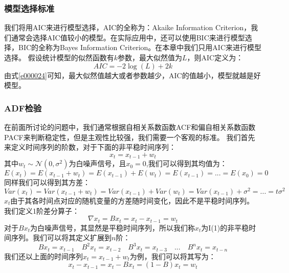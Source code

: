 \documentclass{article}
\begin{document}
\subsubsection{模型选择标准}
我们将用AIC来进行模型选择，AIC的全称为：Akaike Information Criterion，我们通常会选择AIC值较小的模型。在实际应用中，还可以使用BIC来进行模型选择，BIC的全称为Bayes Information Criterion。在本章中我们只用AIC来进行模型选择。\newline
假设统计模型的似然函数有$k$参数，最大似然值为$L$，则AIC定义为：
\begin{equation}
AIC=-2\log(L) + 2k
\label{e000024}
\end{equation}
由式\ref{e000024}可知，最大似然值越大或者参数越少，AIC的值越小，模型就越是好模型。
\subsubsection{ADF检验}
在前面所讨论的问题中，我们通常根据自相关系数函数ACF和偏自相关系数函数PACF来判断稳定性，但是主观性比较强，我们需要一个客观的标准。\newline
我们首先来定义时间序列的阶数，对于下面的非平稳时间序列：
\begin{equation}
x_{t}=x_{t-1}+w_{t}
\label{e000036}
\end{equation}
其中$w_{t} \sim \mathcal{N}(0, \sigma ^{2})$为白噪声信号，且$x_{0}=0$,我们可以得到其均值为：
\begin{equation}
E(x_{t})=E(x_{t-1}+w_{t})=E(x_{t-1})+E(w_{t})=E(x_{t-1})=...=E(x_{0})=0
\label{e000037}
\end{equation}
同样我们可以得到其方差：
\begin{equation}
Var(x_{t})=Var(x_{t-1}+w_{t})=Var(x_{t-1})+Var(w_{t})=Var(x_{t-1})+\sigma ^{2}=...=t\sigma ^{2}
\label{e000038}
\end{equation}
$x_{t}$由于其各时间点对应的随机变量的方差随时间变化，因此不是平稳时间序列。\newline
我们定义1阶差分算子：
\begin{equation}
\nabla x_{t} = Bx_{t}=x_{t}-x_{t-1}=w_{t}
\label{e000039}
\end{equation}
对于$Bx_{t}$为白噪声信号，其显然是平稳时间序列，所以我们称$x_{t}$为I(1)的非平稳时间序列。我们可以将其定义扩展到$n$阶：
\begin{equation}
Bx_{t}=x_{t-1} \quad B^{2}x_{t}=x_{t-2} \quad B^{3}x_{t}=x_{t-3} \quad ...  \quad B^{n}x_{t}=x_{t-n}
\label{e000040}
\end{equation}
我们还以上面的时间序列$x_{t}=x_{t-1}+w_t$为例，我们可以将其写为：
\begin{equation}
x_{t}-x_{t-1}=x_{t}-Bx_{t}=(1-B)x_{t}=w_{t}
\label{e000041}
\end{equation}
\end{document}
